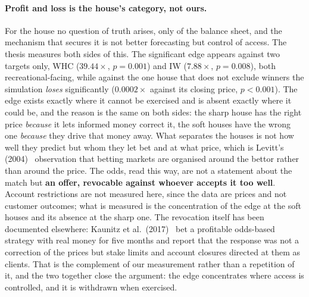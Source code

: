 \documentclass[12pt,a4paper,oneside]{report}
\renewcommand{\_}{\oldunderscore\allowbreak}
\theoremstyle{definition}
\theoremstyle{plain}
\theoremstyle{definition}   %
\begin{document}
\paragraph{Profit and loss is the house's category, not ours.} For the house no question of
truth arises, only of the balance sheet, and the mechanism that secures it is not better
forecasting but control of access. The thesis measures both sides of this. The significant edge
appears against two targets only, WHC ($39.44\times$, $p=0.001$) and IW ($7.88\times$,
$p=0.008$), both recreational-facing, while against the one house that does not exclude winners
the simulation \emph{loses} significantly ($0.0002\times$ against its closing price, $p<0.001$). The edge exists exactly
where it cannot be exercised and is absent exactly where it could be, and the reason is the same
on both sides: the sharp house has the right price \emph{because} it lets informed money correct
it, the soft houses have the wrong one \emph{because} they drive that money away. What separates
the houses is not how well they predict but whom they let bet and at what price, which is
Levitt's (2004)~\cite{levitt2004} observation that betting markets are organised around the bettor rather than
around the price. The odds, read this way, are not a statement about the match but \textbf{an
offer, revocable against whoever accepts it too well}. Account restrictions are not measured
here, since the data are prices and not customer outcomes; what is measured is the concentration
of the edge at the soft houses and its absence at the sharp one. The revocation itself has been
documented elsewhere: Kaunitz et al.\ (2017)~\cite{kaunitz2017} bet a profitable odds-based strategy with real
money for five months and report that the response was not a correction of the prices but stake
limits and account closures directed at them as clients. That is the complement of our
measurement rather than a repetition of it, and the two together close the argument: the edge
concentrates where access is controlled, and it is withdrawn when exercised.
\end{document}
